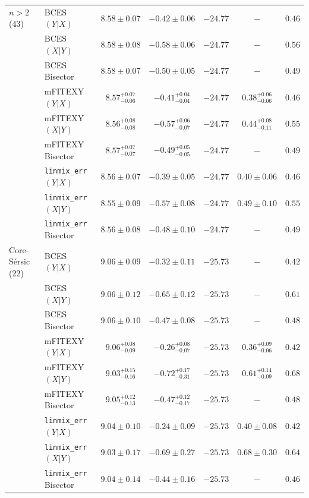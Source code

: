 \documentclass[preprint2]{emulateapj}
\begin{document}
\begin{table}
\begin{tabular}{llccccc}
$n>2$ (43)             & BCES $(Y|X)$      & $8.58 \pm 0.07$ & $-0.42 \pm 0.06$ & $-24.77$ & $-$ & $0.46$ \\
                       & BCES $(X|Y)$      & $8.58 \pm 0.08$ & $-0.58 \pm 0.06$ & $-24.77$ & $-$ & $0.56$ \\
                       & BCES Bisector     & $8.58 \pm 0.07$ & $-0.50 \pm 0.05$ & $-24.77$ & $-$ & $0.49$ \\
                       & mFITEXY $(Y|X)$    & $8.57^{+0.07}_{-0.06}$ & $-0.41^{+0.04}_{-0.04}$ & $-24.77$ & $0.38^{+0.06}_{-0.06}$ & $0.46$ \\
                       & mFITEXY $(X|Y)$    & $8.56^{+0.08}_{-0.08}$ & $-0.57^{+0.06}_{-0.07}$ & $-24.77$ & $0.44^{+0.08}_{-0.11}$ & $0.55$ \\
                       & mFITEXY Bisector   & $8.57^{+0.07}_{-0.07}$ & $-0.49^{+0.05}_{-0.05}$ & $-24.77$ & $-$    & $0.49$ \\
                       & {\tt linmix\_err} $(Y|X)$     & $8.56 \pm 0.07$ & $-0.39 \pm 0.05$ & $-24.77$ & $0.40 \pm 0.06$ & $0.46$ \\
                       & {\tt linmix\_err} $(X|Y)$     & $8.55 \pm 0.09$ & $-0.57 \pm 0.08$ & $-24.77$ & $0.49 \pm 0.10$ & $0.55$ \\
                       & {\tt linmix\_err} Bisector    & $8.56 \pm 0.08$ & $-0.48 \pm 0.10$ & $-24.77$ & $-$    & $0.49$ \\  [0.5em]
                   
Core-S\'ersic (22) & BCES $(Y|X)$   & $9.06 \pm 0.09$ & $-0.32 \pm 0.11$  & $-25.73$ & $-$    & $0.42$ \\
                   & BCES $(X|Y)$   & $9.06 \pm 0.12$ & $-0.65 \pm 0.12$  & $-25.73$ & $-$    & $0.61$ \\
                   & BCES Bisector  & $9.06 \pm 0.10$ & $-0.47 \pm 0.08$  & $-25.73$ & $-$    & $0.48$ \\
                   & mFITEXY $(Y|X)$   & $9.06^{+0.08}_{-0.09}$ & $-0.26^{+0.08}_{-0.07}$ & $-25.73$ & $0.36^{+0.09}_{-0.06}$ & $0.42$ \\
                   & mFITEXY $(X|Y)$   & $9.03^{+0.15}_{-0.16}$ & $-0.72^{+0.17}_{-0.31}$ & $-25.73$ & $0.61^{+0.14}_{-0.09}$ & $0.68$ \\
                   & mFITEXY Bisector  & $9.05^{+0.12}_{-0.13}$ & $-0.47^{+0.12}_{-0.17}$ & $-25.73$ & $-$    & $0.48$ \\
                   & {\tt linmix\_err} $(Y|X)$  & $9.04 \pm 0.10$ & $-0.24 \pm 0.09$ & $-25.73$ & $0.40 \pm 0.08$ & $0.42$ \\
                   & {\tt linmix\_err} $(X|Y)$  & $9.03 \pm 0.17$ & $-0.69 \pm 0.27$ & $-25.73$ & $0.68 \pm 0.30$ & $0.64$ \\
                   & {\tt linmix\_err} Bisector & $9.04 \pm 0.14$ & $-0.44 \pm 0.16$ & $-25.73$ & $-$    & $0.46$ \\ [0.5em]


\end{tabular}
\end{table}
\end{document}
